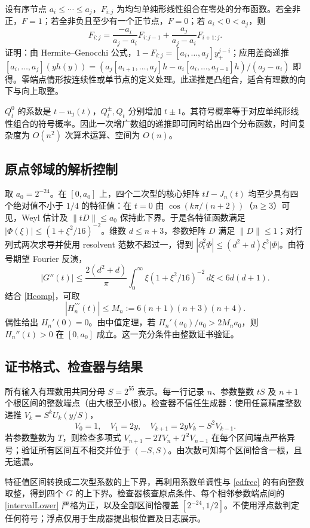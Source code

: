 \documentclass[11pt,a4paper,fontset=fandol]{ctexart}
\begin{document}
设有序节点 $a_i\le\cdots\le a_j$，$F_{i:j}$ 为均匀单纯形线性组合在零处的分布函数。若全非正，$F=1$；若全非负且至少有一个正节点，$F=0$；若 $a_i<0<a_j$，则
\begin{equation}\label{cdfrec}
F_{i:j}=\frac{-a_i}{a_j-a_i}F_{i:j-1}+\frac{a_j}{a_j-a_i}F_{i+1:j}.
\end{equation}
证明：由 Hermite--Genocchi 公式，$1-F_{i:j}=[a_i,\ldots,a_j]y_+^{j-i}$；应用差商递推 $[a_i,\ldots,a_j](y h(y))=(a_j[a_{i+1},\ldots,a_j]h-a_i[a_i,\ldots,a_{j-1}]h)/(a_j-a_i)$ 即得。零端点情形按连续性或单节点的定义处理。此递推是凸组合，适合有理数的向下与向上取整。

$Q_t^0$ 的系数是 $t-u_j(t)$，$Q_t^\pm,Q_t$ 分别增加 $t\pm1$。其符号概率等于对应单纯形线性组合的符号概率。因此一次增广数组的递推即可同时给出四个分布函数，时间复杂度为 $O(n^2)$ 次算术运算、空间为 $O(n)$。
\subsection{原点邻域的解析控制}
取 $a_0=2^{-24}$。在 $[0,a_0]$ 上，四个二次型的核心矩阵 $tI-J_n(t)$ 均至少具有四个绝对值不小于 $1/4$ 的特征值：在 $t=0$ 由 $\cos(k\pi/(n+2))$（$n\ge3$）可见，Weyl 估计及 $\|tD\|\le a_0$ 保持此下界。于是各特征函数满足 $|\Phi(\xi)|\le(1+\xi^2/16)^{-2}$。维数 $d\le n+3$，参数矩阵 $D$ 满足 $\|D\|\le1$；对行列式两次求导并使用 resolvent 范数不超过一，得到 $|\partial_t^2\Phi|\le(d^2+d)\xi^2|\Phi|$。由符号期望 Fourier 反演，
\[|G''(t)|\le\frac{2(d^2+d)}\pi\int_0^\infty\xi(1+\xi^2/16)^{-2}\,d\xi<6d(d+1).\]
结合 \eqref{Hcomp}，可取
\[|H_n^{\prime\prime\prime}(t)|\le M_n:=6(n+1)(n+3)(n+4).\]
偶性给出 $H_n'(0)=0$。由中值定理，若 $H_n'(a_0)/a_0>2M_na_0$，则 $H_n''(t)>0$ 在 $[0,a_0]$ 成立。这一充分条件由整数证书验证。
\subsection{证书格式、检查器与结果}
所有输入有理数用共同分母 $S=2^{55}$ 表示。每一行记录 $n$、参数整数 $tS$ 及 $n+1$ 个根区间的整数端点（由大根至小根）。检查器不信任生成器：使用任意精度整数递推 $V_k=S^kU_k(y/S)$，
\[V_0=1,\quad V_1=2y,\quad V_{k+1}=2yV_k-S^2V_{k-1}.\]
若参数整数为 $T$，则检查多项式 $V_{n+1}-2TV_n+T^2V_{n-1}$ 在每个区间端点严格异号；验证所有区间互不相交并位于 $(-S,S)$。由次数可知每个区间恰含一根，且无遗漏。

特征值区间转换成二次型系数的上下界，再利用系数单调性与 \eqref{cdfrec} 的有向整数取整，得到四个 $G$ 的上下界。检查器核查原点条件、每个相邻参数端点间的 \eqref{intervalLower} 严格为正，以及全部区间恰覆盖 $[2^{-24},1/2]$。不使用浮点数判定任何符号；浮点仅用于生成器提出根位置及日志展示。
\end{document}
